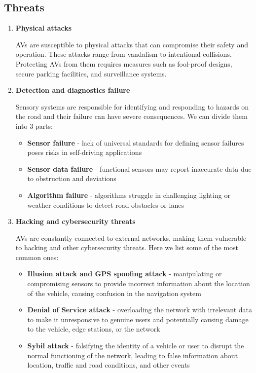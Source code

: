 \documentclass[10pt,oneside,english,a4paper]{article}
\begin{document}
\subsection{Threats}
\begin{enumerate}
    \item \textbf{Physical attacks}
    \par AVs are susceptible to physical attacks that can compromise their safety and operation. These attacks range from vandalism to intentional collisions. Protecting AVs from them requires measures such as fool-proof designs, secure parking facilities, and surveillance systems.
    \item \textbf{Detection and diagnostics failure}
    \par Sensory systems are responsible for identifying and responding to hazards on the road and their failure can have severe consequences. We can divide them into 3 parts:
    \begin{itemize}
        \item \textbf{Sensor failure} - lack of universal standards for defining sensor failures poses risks in self-driving applications
        \item \textbf{Sensor data failure} - functional sensors may report inaccurate data due to obstruction and deviations 
        \item \textbf{Algorithm failure} - algorithms struggle in challenging lighting or weather conditions to detect road obstacles or lanes
    \end{itemize}
    \item \textbf{Hacking and cybersecurity threats}
    \par AVs are constantly connected to external networks, making them vulnerable to hacking and other cybersecurity threats. Here we list some of the most common ones:
    \begin{itemize}
        \item \textbf{Illusion attack and GPS spoofing attack} - manipulating or compromising sensors to provide incorrect information about the location of the vehicle, causing confusion in the navigation system
        \item \textbf{Denial of Service attack} - overloading the network with irrelevant data to make it unresponsive to genuine users and potentially causing damage to the vehicle, edge stations, or the network
        \item \textbf{Sybil attack} - falsifying the identity of a vehicle or user to disrupt the normal functioning of the network, leading to false information about location, traffic and road conditions, and other events

\end{itemize}
\end{enumerate}
\end{document}
